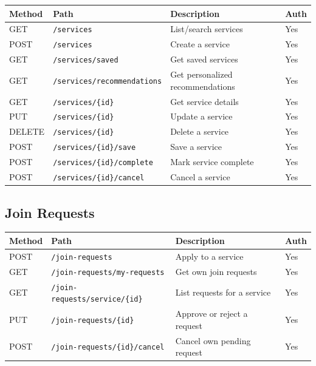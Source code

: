 \documentclass[11pt,a4paper]{report}
\begin{document}
\begin{longtable}{|l|p{6.5cm}|p{5cm}|l|}
    \hline
    \textbf{Method} & \textbf{Path}                      & \textbf{Description}             & \textbf{Auth} \\
    \hline
    \endhead
    GET             & \texttt{/services}                 & List/search services             & Yes           \\
    \hline
    POST            & \texttt{/services}                 & Create a service                 & Yes           \\
    \hline
    GET             & \texttt{/services/saved}           & Get saved services               & Yes           \\
    \hline
    GET             & \texttt{/services/recommendations} & Get personalized recommendations & Yes           \\
    \hline
    GET             & \texttt{/services/\{id\}}          & Get service details              & Yes           \\
    \hline
    PUT             & \texttt{/services/\{id\}}          & Update a service                 & Yes           \\
    \hline
    DELETE          & \texttt{/services/\{id\}}          & Delete a service                 & Yes           \\
    \hline
    POST            & \texttt{/services/\{id\}/save}     & Save a service                   & Yes           \\
    \hline
    POST            & \texttt{/services/\{id\}/complete} & Mark service complete            & Yes           \\
    \hline
    POST            & \texttt{/services/\{id\}/cancel}   & Cancel a service                 & Yes           \\
    \hline
\end{longtable}

\subsection{Join Requests}

\begin{longtable}{|l|p{6.5cm}|p{5cm}|l|}
    \hline
    \textbf{Method} & \textbf{Path}                          & \textbf{Description}        & \textbf{Auth} \\
    \hline
    \endhead
    POST            & \texttt{/join-requests}                & Apply to a service          & Yes           \\
    \hline
    GET             & \texttt{/join-requests/my-requests}    & Get own join requests       & Yes           \\
    \hline
    GET             & \texttt{/join-requests/service/\{id\}} & List requests for a service & Yes           \\
    \hline
    PUT             & \texttt{/join-requests/\{id\}}         & Approve or reject a request & Yes           \\
    \hline
    POST            & \texttt{/join-requests/\{id\}/cancel}  & Cancel own pending request  & Yes           \\
    \hline
\end{longtable}
\end{document}
